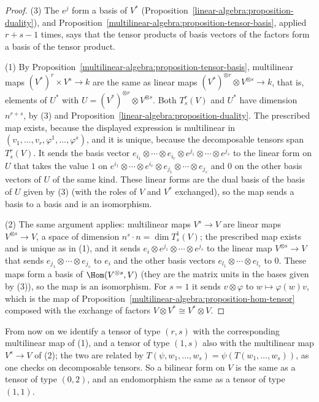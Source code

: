 \begin{proof}
(3) The $e^j$ form a basis of $V^*$ (Proposition~\ref{linear-algebra:proposition-duality}), and Proposition~\ref{multilinear-algebra:proposition-tensor-basis}, applied
$r + s - 1$ times, says that the tensor products of basis vectors of the factors form a basis of the tensor product.

(1) By Proposition~\ref{multilinear-algebra:proposition-tensor-basis}, multilinear maps $(V^*)^r \times V^s \to k$ are the same as linear maps
$(V^*)^{\otimes r} \otimes V^{\otimes s} \to k$, that is, elements of $U^*$ with $U = (V^*)^{\otimes r} \otimes V^{\otimes s}$. Both $T^r_s(V)$ and $U^*$ have dimension $n^{r+s}$,
by (3) and Proposition~\ref{linear-algebra:proposition-duality}. The prescribed map exists, because the displayed expression is multilinear in
$(v_1, \ldots, v_r, \varphi^1, \ldots, \varphi^s)$, and it is unique, because the decomposable tensors span $T^r_s(V)$. It sends the basis vector
$e_{i_1} \otimes \cdots \otimes e_{i_r} \otimes e^{j_1} \otimes \cdots \otimes e^{j_s}$ to the linear form on $U$ that takes the value $1$ on
$e^{i_1} \otimes \cdots \otimes e^{i_r} \otimes e_{j_1} \otimes \cdots \otimes e_{j_s}$ and $0$ on the other basis vectors of $U$ of the same kind. These linear forms are the dual basis of the
basis of $U$ given by (3) (with the roles of $V$ and $V^*$ exchanged), so the map sends a basis to a basis and is an isomorphism.

(2) The same argument applies: multilinear maps $V^s \to V$ are linear maps $V^{\otimes s} \to V$, a space of dimension $n^s \cdot n = \dim T^1_s(V)$; the prescribed map
exists and is unique as in (1), and it sends $e_i \otimes e^{j_1} \otimes \cdots \otimes e^{j_s}$ to the linear map $V^{\otimes s} \to V$ that sends
$e_{j_1} \otimes \cdots \otimes e_{j_s}$ to $e_i$ and the other basis vectors $e_{l_1} \otimes \cdots \otimes e_{l_s}$ to $0$. These maps form a basis of $\Hom(V^{\otimes s}, V)$ (they are the
matrix units in the bases given by (3)), so the map is an isomorphism. For $s = 1$ it sends $v \otimes \varphi$ to $w \mapsto \varphi(w)v$, which is the map of
Proposition~\ref{multilinear-algebra:proposition-hom-tensor} composed with the exchange of factors $V \otimes V^* \cong V^* \otimes V$.
\end{proof}

From now on we identify a tensor of type $(r,s)$ with the corresponding multilinear map of (1), and a tensor of type $(1,s)$ also with the multilinear map
$V^s \to V$ of (2); the two are related by $T(\psi, w_1, \ldots, w_s) = \psi(T(w_1, \ldots, w_s))$, as one checks on decomposable tensors. So a bilinear form on $V$ is
the same as a tensor of type $(0,2)$, and an endomorphism the same as a tensor of type $(1,1)$.

